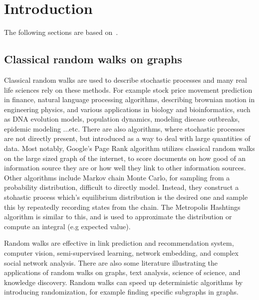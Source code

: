 \chapter{Introduction}


The following sections are based on~\cite{XiaReview}.

\section{Classical random walks on graphs}

Classical random walks are used to describe stochastic processes and many real life sciences rely on these methods. For example stock price movement prediction in finance, natural language processing algorithms, describing brownian motion in engineering physics, and various applications in biology and bioinformatics, such as DNA evolution models, population dynamics, modeling disease outbreaks, epidemic modeling ...etc. There are also algorithms, where stochastic processes are not directly present, but introduced as a way to deal with large quantities of data. Most notably, Google's Page Rank algorithm utilizes classical random walks on the large sized graph of the internet, to score documents on how good of an information source they are or how well they link to other information sources. Other algorithms include Markov chain Monte Carlo, for sampling from a probability distribution, difficult to directly model. Instead, they construct a stohastic process which's equilibrium distribution is the desired one and sample this by repeatedly recording states from the chain. The Metropolis Hashtings algorithm is similar to this, and is used to approximate the distribution or compute an integral (e.g expected value).


Random walks are effective in link prediction and recommendation system, computer vision, semi-supervised learning, network embedding, and complex social network analysis. There are also some literature illustrating the applications of random walks on graphs, text analysis, science of science, and knowledge discovery. Random walks can speed up deterministic algorithms by introducing randomization, for example finding specific subgraphs in graphs.

